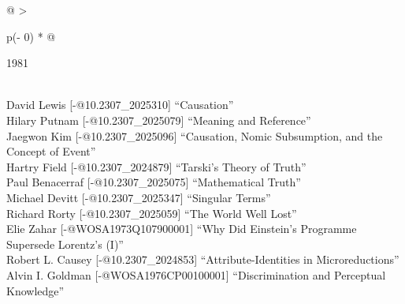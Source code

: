 \documentclass[
  10pt,
  letterpaper,
  DIV=11,
  numbers=noendperiod,
  twoside]{scrartcl}
\begin{document}
\begin{longtable}[]{@{}
  >{\raggedright\arraybackslash}p{(\columnwidth - 0\tabcolsep) * }@{}}

\caption{\label{tbl-top-ten-1972}Most cited articles published less than
ten years ago as of 1981.}

\tabularnewline

\toprule\noalign{}
\begin{minipage}[b]{\linewidth}\raggedright
1981
\end{minipage} \\
\midrule\noalign{}
\endhead
\bottomrule\noalign{}
\endlastfoot
David Lewis {[}-@10.2307\_2025310{]} ``Causation'' \\
Hilary Putnam {[}-@10.2307\_2025079{]} ``Meaning and Reference'' \\
Jaegwon Kim {[}-@10.2307\_2025096{]} ``Causation, Nomic Subsumption, and
the Concept of Event'' \\
Hartry Field {[}-@10.2307\_2024879{]} ``Tarski's Theory of Truth'' \\
Paul Benacerraf {[}-@10.2307\_2025075{]} ``Mathematical Truth'' \\
Michael Devitt {[}-@10.2307\_2025347{]} ``Singular Terms'' \\
Richard Rorty {[}-@10.2307\_2025059{]} ``The World Well Lost'' \\
Elie Zahar {[}-@WOSA1973Q107900001{]} ``Why Did Einstein's Programme
Supersede Lorentz's (I)'' \\
Robert L. Causey {[}-@10.2307\_2024853{]} ``Attribute-Identities in
Microreductions'' \\
Alvin I. Goldman {[}-@WOSA1976CP00100001{]} ``Discrimination and
Perceptual Knowledge'' \\

\end{longtable}
\end{document}
